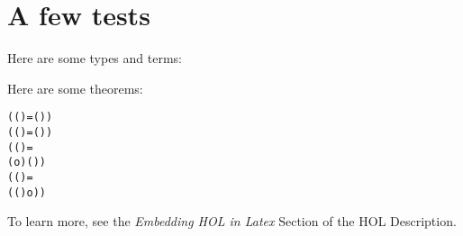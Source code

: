 \documentclass[12pt]{article}
\begin{document}
\section*{A few tests}

Here are some types and terms:
\begin{alltt}\small
  \HOLinline{(:\ensuremath{\alpha})}
\end{alltt}

Here are some theorems:
\begin{alltt}\small
  \HOLTokenTurnstile{} (  (  ) =   (  )) \HOLTokenImp{}
   ( (   )  =  (   ) )
  \HOLTokenTurnstile{}     \HOLTokenConj{}    \HOLTokenConj{}
   (  (  ) =
     ( o ) (  )) \HOLTokenImp{}
   ( (   )  =
     (   (  ) o ) )
\end{alltt}

To learn more, see the \emph{Embedding HOL in Latex}
Section of the HOL Description.
\end{document}
